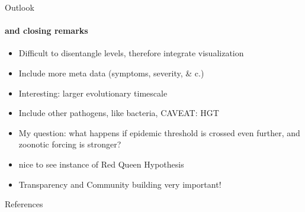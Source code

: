 \documentclass{beamer}
\begin{document}
\begin{darkframes}
    \begin{frame}{Outlook}
      \framesubtitle{and closing remarks}
      \begin{itemize}
        \item Difficult to disentangle levels, therefore integrate visualization
        \item Include more meta data (symptoms, severity, \& c.)
        \item Interesting: larger evolutionary timescale
        \item Include other pathogens, like bacteria, CAVEAT: HGT
        \item My question: what happens if epidemic threshold is crossed even further, and zoonotic forcing is stronger?
        \item nice to see instance of Red Queen Hypothesis
        \item Transparency and Community building very important!
      \end{itemize}
    \end{frame}

    \begin{frame}[allowframebreaks]{References}
    \tiny


    \end{frame}




  \end{darkframes}
\end{document}
